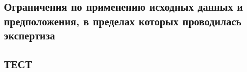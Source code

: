 \subsection{Ограничения по применению исходных данных и предположения, в пределах которых проводилась экспертиза}



\subsection{ТЕСТ}






 
